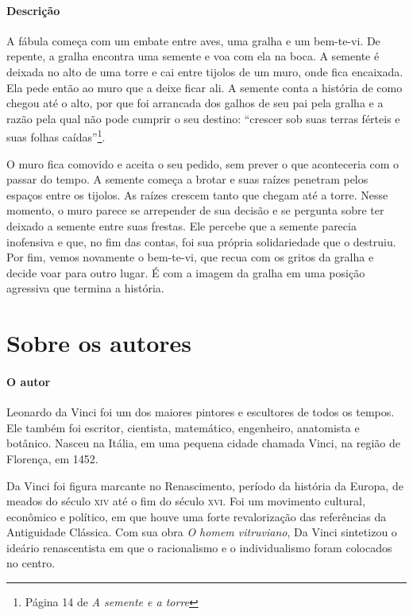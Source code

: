 \documentclass[11pt]{extarticle}
\begin{document}
\paragraph{Descrição} A fábula começa com um embate entre aves, uma gralha e um bem-te-vi. De repente, a gralha encontra uma semente e voa com ela na boca. A semente é deixada no alto de uma torre e cai entre tijolos de um muro, onde fica encaixada. Ela pede então ao muro que a deixe ficar ali. A semente conta a história de como chegou até o alto, por que foi arrancada dos galhos de seu pai pela gralha e a razão pela qual não pode cumprir o seu destino: ``crescer sob suas terras férteis e suas folhas caídas''\footnote{Página 14 de \textit{A semente e a torre}}. 

O muro fica comovido e aceita o seu pedido, sem prever o que aconteceria com o passar do tempo. A semente começa a brotar e suas raízes penetram pelos espaços entre os tijolos. As raízes crescem tanto que chegam até a torre. Nesse momento, o muro parece se arrepender de sua decisão e se pergunta sobre ter deixado a semente entre suas frestas. Ele percebe que a semente parecia inofensiva e que, no fim das contas, foi sua própria solidariedade que o destruiu. Por fim, vemos novamente o bem-te-vi, que recua com os gritos da gralha e decide voar para outro lugar. É com a imagem da gralha em uma posição agressiva que termina a história.

\section{Sobre os autores}


\paragraph{O autor} Leonardo da Vinci foi um dos maiores pintores e escultores de todos os tempos. Ele também foi escritor, cientista, matemático, engenheiro, anatomista e botânico. Nasceu na Itália, em uma pequena cidade chamada Vinci, na região de Florença, em 1452.

Da Vinci foi figura marcante no Renascimento, período da história da Europa, de meados do século \textsc{xiv} até o fim do século  \textsc{xvi}. Foi um movimento cultural, econômico e político, em que houve uma forte revalorização das referências da Antiguidade Clássica. Com sua obra \textit{O homem vitruviano}, Da Vinci sintetizou o ideário renascentista em que o racionalismo e o individualismo foram colocados no centro.
\end{document}
